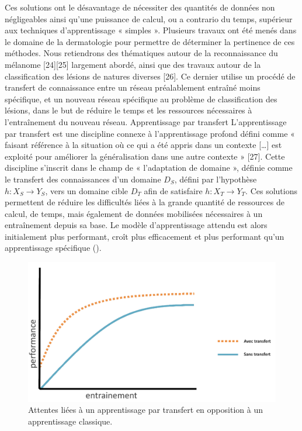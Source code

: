 Ces solutions ont le désavantage de nécessiter des quantités de données non négligeables ainsi qu’une puissance de calcul, ou a contrario du temps, supérieur aux techniques d’apprentissage « simples ».
Plusieurs travaux ont été menés dans le domaine de la dermatologie pour permettre de déterminer la pertinence de ces méthodes. Nous retiendrons des thématiques autour de la reconnaissance du mélanome [24][25] largement abordé, ainsi que des travaux autour de la classification des lésions de natures diverses [26]. Ce dernier utilise un procédé de transfert de connaissance entre un réseau préalablement entraîné moins spécifique, et un nouveau réseau spécifique au problème de classification des lésions, dans le but de réduire le temps et les ressources nécessaires à l’entraînement du nouveau réseau.
Apprentissage par transfert
L’apprentissage par transfert est une discipline connexe à l’apprentissage profond défini comme « faisant référence à la situation où ce qui a été appris dans un contexte […] est exploité pour améliorer la généralisation dans une autre contexte » [27]. Cette discipline s’inscrit dans le champ de « l’adaptation de domaine », définie comme le transfert des connaissances d’un domaine $D_S$, défini par l’hypothèse $h: X_S \rightarrow Y_S$, vers un domaine cible $D_T$ afin de satisfaire $h: X_T \rightarrow Y_T$.
Ces solutions permettent de réduire les difficultés liées à la grande quantité de ressources de calcul, de temps, mais également de données mobilisées nécessaires à un entraînement depuis sa base. Le modèle d’apprentissage attendu est alors initialement plus performant, croît plus efficacement et plus performant qu’un apprentissage spécifique  ().

\begin{figure}[H]
    \centering
    \includegraphics[width=\linewidth]{contents/chapter_3/resources/example_learning_curves.pdf}
    \caption{ Attentes liées à un apprentissage par transfert en opposition à un apprentissage classique.}
    \label{fig:learning_curves}
\end{figure}

